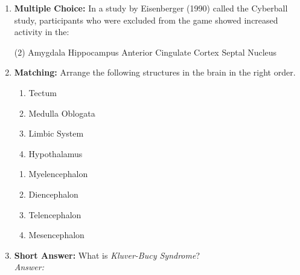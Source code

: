 \begin{enumerate}[label=\textbf{Q1.10.\arabic*}]
            \item \textbf{Multiple Choice:} In a study by Eisenberger (1990) called the Cyberball study, participants who were excluded from the game showed increased activity in the:
            \begin{tasks}[label=(\Alph*), label-width=1.5em, item-indent=1.7em](2) %
                  \task Amygdala
                  \task Hippocampus
                  \task Anterior Cingulate Cortex
                  \task Septal Nucleus
            \end{tasks}
\newpage
      \item \textbf{Matching:} Arrange the following structures in the brain in the right order.
      \begin{wordbox}
            \begin{enumerate}[label=(\roman*)]
                  \item Tectum
                  \item Medulla Oblogata
                  \item Limbic System
                  \item Hypothalamus
            \end{enumerate}
      \end{wordbox}
      \begin{enumerate}[label=(\alph*)]
            \item Myelencephalon \quad \dotfill \quad \underline{\hspace{3cm}}\\[0.5em]
            \item Diencephalon \quad \dotfill \quad \underline{\hspace{3cm}}\\[0.5em]
            \item Telencephalon \quad \dotfill \quad \underline{\hspace{3cm}}\\[0.5em]
            \item Mesencephalon \quad \dotfill \quad \underline{\hspace{3cm}}\\
      \end{enumerate}

      \item \textbf{Short Answer:} What is \textit{Kluver-Bucy Syndrome}? \\
            \textit{Answer:} %


\end{enumerate}
